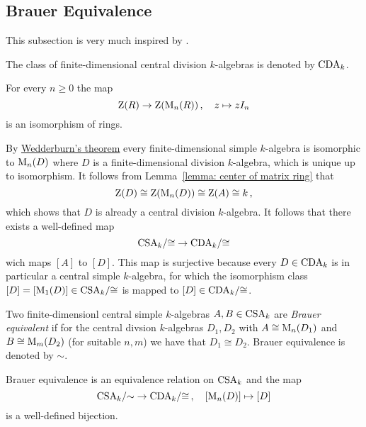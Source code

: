 \subsection{Brauer Equivalence}


\begin{fluff}
  This subsection is very much inspired by \cite[4.2]{Clark2012NonCA}.
\end{fluff}


\begin{notation}
  The class of finite-dimensional central division $k$-algebras is denoted by $\operatorname{CDA}_k$.
\end{notation}


\begin{lemma}
  \label{lemma: center of matrix ring}
  For every $n \geq 0$ the map
  \[
            \operatorname{Z}(R)
    \to     \operatorname{Z}(\operatorname{M}_n(R))  \,,
    \quad   z
    \mapsto z I_n
  \]
  is an isomorphism of rings.
\end{lemma}


\begin{fluff}
  By \hyperref[theorem: wedderburns theorem]{Wedderburn’s theorem} every finite-dimensional simple $k$-algebra is isomorphic to $\operatorname{M}_n(D)$ where $D$ is a finite-dimensional division $k$-algebra, which is unique up to isomorphism.
  It follows from Lemma~\ref{lemma: center of matrix ring} that
  \[
          \operatorname{Z}(D)
    \cong \operatorname{Z}(\operatorname{M}_n(D))
    \cong \operatorname{Z}(A)
    \cong k \,,
  \]
  which shows that $D$ is already a central division $k$-algebra.
  It follows that there exists a well-defined map
  \[
        \operatorname{CSA}_k\!/{\cong}
    \to \operatorname{CDA}_k\!/{\cong}
  \]
  wich maps $[A]$ to $[D]$.
  This map is surjective because every $D \in \operatorname{CDA}_k$ is in particular a central simple $k$-algebra, for which the isomorphism class $[D] = [\operatorname{M}_1(D)] \in \operatorname{CSA}_k\!/{\cong}$ is mapped to $[D] \in \operatorname{CDA}_k\!/{\cong}$.
\end{fluff}


\begin{definition}
  Two finite-dimensionl central simple $k$-algebras $A, B \in \operatorname{CSA}_k$ are \emph{Brauer equivalent} if for the central divsion $k$-algebras $D_1, D_2$ with $A \cong \operatorname{M}_n(D_1)$ and $B \cong \operatorname{M}_m(D_2)$ (for suitable $n, m$) we have that $D_1 \cong D_2$.
  Brauer equivalence is denoted by $\sim$.
\end{definition}


\begin{corollary}
  Brauer equivalence is an equivalence relation on $\operatorname{CSA}_k$ and the map
  \[
        \operatorname{CSA}_k\!/{\sim}
    \to \operatorname{CDA}_k\!/{\cong} \,,
    \quad   [\operatorname{M}_n(D)]
    \mapsto [D]
  \]
  is a well-defined bijection.
\end{corollary}


